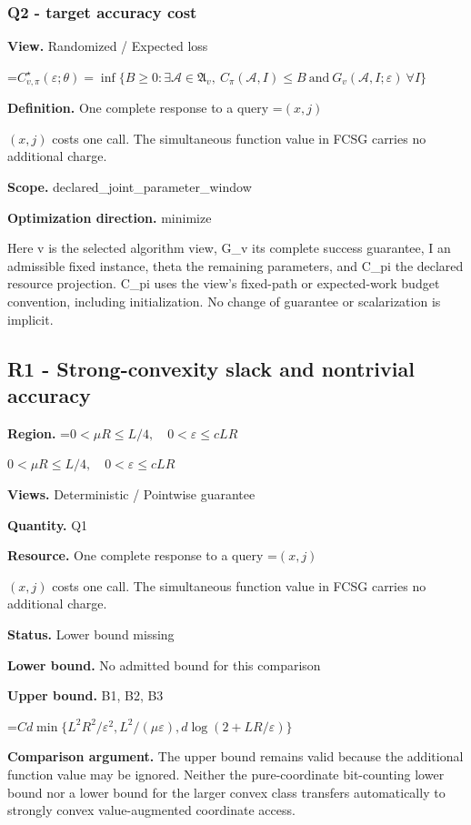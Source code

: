 \documentclass[10pt,a4paper]{article}
\newcommand{\AtlasMath}[1]{\par\begingroup\centering\setbox0=\hbox{$\displaystyle #1$}\ifdim\wd0>1.4\linewidth\typeout{ATLAS WIDE FORMULA: \the\wd0}\fi\ifdim\wd0>\linewidth\resizebox{\linewidth}{!}{\box0}\else\box0\fi\par\endgroup}
\newcommand{\AtlasInlineMath}[1]{\begingroup\setbox0=\hbox{$#1$}\ifdim\wd0>.4\linewidth\endgroup\AtlasMath{#1}\else\endgroup$#1$\fi}
\begin{document}
\subsubsection{Q2 - target accuracy cost}
\textbf{View.} Randomized / Expected loss

\AtlasMath{C^\star_{v,\pi}(\varepsilon;\theta)=\inf\{B\ge0:\exists\mathcal A\in\mathfrak A_v,\ C_\pi(\mathcal A,I)\le B\ \text{and}\ G_v(\mathcal A,I;\varepsilon)\ \forall I\}}
\textbf{Definition.} One complete response to a query \AtlasInlineMath{(x,j)} costs one call. The simultaneous function value in FCSG carries no additional charge.

\textbf{Scope.} declared\_joint\_parameter\_window

\textbf{Optimization direction.} minimize

Here v is the selected algorithm view, G\_v its complete success guarantee, I an admissible fixed instance, theta the remaining parameters, and C\_pi the declared resource projection. C\_pi uses the view's fixed-path or expected-work budget convention, including initialization. No change of guarantee or scalarization is implicit.

\subsection{R1 - Strong-convexity slack and nontrivial accuracy}
\textbf{Region.} \AtlasInlineMath{0<\mu R\le L/4,\quad0<\varepsilon\le cLR}

\textbf{Views.} Deterministic / Pointwise guarantee

\textbf{Quantity.} Q1

\textbf{Resource.} One complete response to a query \AtlasInlineMath{(x,j)} costs one call. The simultaneous function value in FCSG carries no additional charge.

\textbf{Status.} Lower bound missing

\textbf{Lower bound.} No admitted bound for this comparison

\textbf{Upper bound.} B1, B2, B3

\AtlasMath{Cd\min\{L^2R^2/\varepsilon^2,L^2/(\mu\varepsilon),d\log(2+LR/\varepsilon)\}}
\textbf{Comparison argument.} The upper bound remains valid because the additional function value may be ignored. Neither the pure-coordinate bit-counting lower bound nor a lower bound for the larger convex class transfers automatically to strongly convex value-augmented coordinate access.
\end{document}

